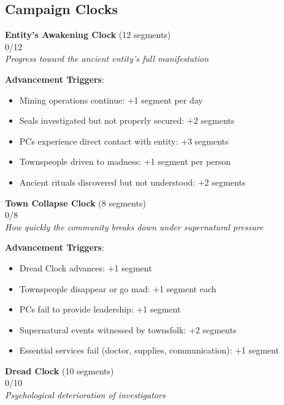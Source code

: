 \documentclass[11pt]{article}
\newcommand{\clocksegment}{\textbullet}
\begin{document}
\subsection*{Campaign Clocks}

\begin{center}
\textbf{Entity's Awakening Clock} (12 segments)\\
\fbox{\clocksegment\clocksegment\clocksegment\clocksegment\clocksegment\clocksegment\clocksegment\clocksegment\clocksegment\clocksegment\clocksegment\clocksegment} 0/12\\
\textit{Progress toward the ancient entity's full manifestation}
\end{center}

\textbf{Advancement Triggers}:
\begin{itemize}[leftmargin=*]
\item Mining operations continue: +1 segment per day
\item Seals investigated but not properly secured: +2 segments
\item PCs experience direct contact with entity: +3 segments
\item Townspeople driven to madness: +1 segment per person
\item Ancient rituals discovered but not understood: +2 segments
\end{itemize}

\begin{center}
\textbf{Town Collapse Clock} (8 segments)\\
\fbox{\clocksegment\clocksegment\clocksegment\clocksegment\clocksegment\clocksegment\clocksegment\clocksegment} 0/8\\
\textit{How quickly the community breaks down under supernatural pressure}
\end{center}

\textbf{Advancement Triggers}:
\begin{itemize}[leftmargin=*]
\item Dread Clock advances: +1 segment
\item Townspeople disappear or go mad: +1 segment each
\item PCs fail to provide leadership: +1 segment
\item Supernatural events witnessed by townsfolk: +2 segments
\item Essential services fail (doctor, supplies, communication): +1 segment
\end{itemize}

\begin{center}
\textbf{Dread Clock} (10 segments)\\
\fbox{\clocksegment\clocksegment\clocksegment\clocksegment\clocksegment\clocksegment\clocksegment\clocksegment\clocksegment\clocksegment} 0/10\\
\textit{Psychological deterioration of investigators}
\end{center}
\end{document}
